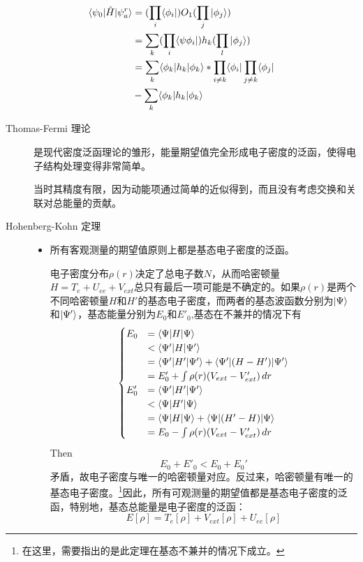 \begin{description}
	\begin{align*}
	\langle \psi_0 | \hat{H} | \psi_a^r \rangle&=(\prod_i\langle \phi_i |)O_1(\prod_j| \phi_j \rangle)\\
	&=\sum_k(\prod_i\langle \psi{\phi_i} |)h_k(\prod_l| \phi_j \rangle)\\
	&=\sum_k \langle \phi_k | h_k | \phi_k \rangle*\prod_{i \neq k} \langle \phi_i | \prod_{j \neq k} \langle \phi_j |\\
	&-\sum_k \langle \phi_k | h_k | \phi_k \rangle
	\end{align*}
\end{description}

\begin{description}
	\item[Thomas-Fermi 理论]
		是现代密度泛函理论的雏形，能量期望值完全形成电子密度的泛函，使得电子结构处理变得非常简单。

		当时其精度有限，因为动能项通过简单的近似得到，而且没有考虑交换和关联对总能量的贡献。
	\item[Hohenberg-Kohn 定理]
	\begin{itemize}
		\item 所有客观测量的期望值原则上都是基态电子密度的泛函。

		电子密度分布$\rho(r)$决定了总电子数$N$，从而哈密顿量$H=T_e+U_{ee}+V_{ext}$总只有最后一项可能是不确定的。如果$\rho(r)$是两个不同哈密顿量$H$和$H'$的基态电子密度，而两者的基态波函数分别为$| \Psi \rangle$和$| \Psi' \rangle$，基态能量分别为$E_0$和$E'_0$,基态在不兼并的情况下有
		\begin{equation}
		\begin{cases}
		E_0&=\langle \Psi | H | \Psi \rangle\\
		&<\langle \Psi' | H | \Psi' \rangle\\
		&=\langle \Psi' | H' | \Psi' \rangle+\langle \Psi' | (H-H') | \Psi' \rangle\\
		&=E_0'+\int \rho(r)(V_{ext}-V'_{ext})\,dr\\
		E_0'&=\langle \Psi' | H' | \Psi' \rangle\\&
		<\langle \Psi | H' | \Psi \rangle\\
		&=\langle \Psi | H | \Psi \rangle+\langle \Psi | (H'-H) | \Psi \rangle\\
		&=E_0-\int \rho(r)(V_{ext}-V'_{ext})\,dr\\
		\end{cases}
		\end{equation}
		Then
		\begin{equation}
		E_0+E'_0<E_0+E_0'
		\end{equation}
		矛盾，故电子密度与唯一的哈密顿量对应。反过来，哈密顿量有唯一的基态电子密度。\footnote{在这里，需要指出的是此定理在基态不兼并的情况下成立。}因此，所有可观测量的期望值都是基态电子密度的泛函，特别地，基态总能量是电子密度的泛函：
		\begin{equation}
		E[\rho]=T_e[\rho]+V_{ext}[\rho]+U_{ee}[\rho]
		\end{equation}


\end{itemize}
\end{description}
